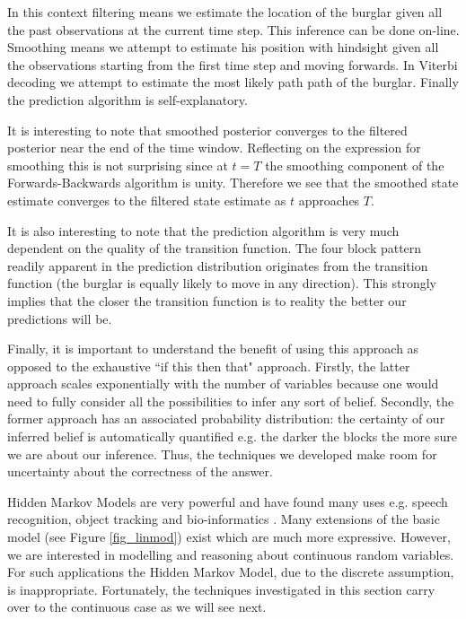 \documentclass[../masters.tex]{subfiles}
\begin{document}
In this context filtering means we estimate the location of the burglar given all the past observations at the current time step. This inference can be done on-line. Smoothing means we attempt to estimate his position with hindsight given all the observations starting from the first time step and moving forwards. In Viterbi decoding we attempt to estimate the most likely path path of the burglar. Finally the prediction algorithm is self-explanatory.

It is interesting to note that smoothed posterior converges to the filtered posterior near the end of the time window. Reflecting on the expression for smoothing this is not surprising since at $t=T$ the smoothing component of the Forwards-Backwards algorithm is unity. Therefore we see that the smoothed state estimate converges to the filtered state estimate as $t$ approaches $T$.

It is also interesting to note that the prediction algorithm is very much dependent on the quality of the transition function. The four block pattern readily apparent in the prediction distribution originates from the transition function (the burglar is equally likely to move in any direction). This strongly implies that the closer the transition function is to reality the better our predictions will be.

Finally, it is important to understand the benefit of using this approach as opposed to the exhaustive ``if this then that" approach. Firstly, the latter approach scales exponentially with the number of variables because one would need to fully consider all the possibilities to infer any sort of belief. Secondly, the former approach has an associated probability distribution: the certainty of our inferred belief is automatically quantified e.g. the darker the blocks the more sure we are about our inference. Thus, the techniques we developed make room for uncertainty about the correctness of the answer.

Hidden Markov Models are very powerful and have found many uses e.g. speech recognition, object tracking and bio-informatics \cite{barber}. Many extensions of the basic model (see Figure \ref{fig_linmod}) exist which are much more expressive. However, we are interested in modelling and reasoning about continuous random variables. For such applications the Hidden Markov Model, due to the discrete assumption, is inappropriate. Fortunately, the techniques investigated in this section carry over to the continuous case as we will see next.  



\end{document}
